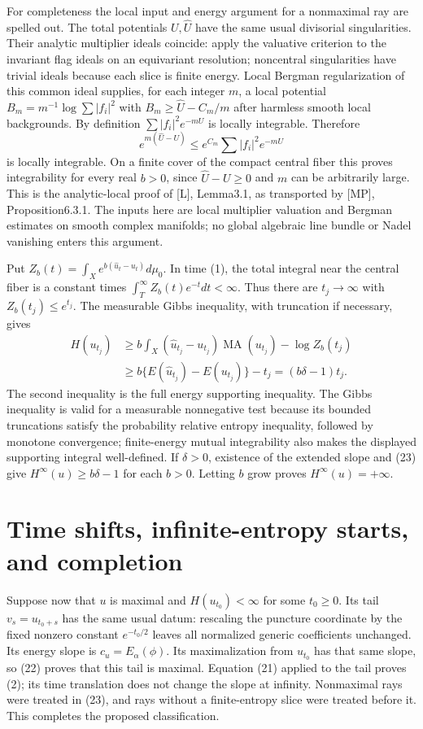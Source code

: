 \documentclass[11pt]{article}
\newcommand{\MA}{\operatorname{MA}}
\begin{document}
For completeness the local input and energy argument for a nonmaximal
ray are spelled out. The total potentials $U,\widehat U$ have the
same usual divisorial singularities. Their analytic multiplier ideals
coincide: apply the valuative criterion to the invariant flag ideals
on an equivariant resolution; noncentral singularities have trivial
ideals because each slice is finite energy. Local Bergman
regularization of this common ideal supplies, for each integer $m$,
a local potential $B_m=m^{-1}\log\sum|f_i|^2$ with
$B_m\geq\widehat U-C_m/m$ after harmless smooth local backgrounds.
By definition $\sum|f_i|^2e^{-mU}$ is locally integrable. Therefore
\[
 e^{m(\widehat U-U)}
          \leq e^{C_m}\sum|f_i|^2e^{-mU}
\]
is locally integrable. On a finite cover of the compact central fiber
this proves integrability for every real $b>0$, since
$\widehat U-U\geq0$ and $m$ can be arbitrarily large.
This is the analytic-local proof of [L], Lemma3.1, as transported by
[MP], Proposition6.3.1. The inputs here are local multiplier
valuation and Bergman estimates on smooth complex manifolds; no
global algebraic line bundle or Nadel vanishing enters this argument.

Put $Z_b(t)=\int_Xe^{b(\widehat u_t-u_t)}d\mu_0$. In time (1),
the total integral near the central fiber is a constant times
$\int_T^\infty Z_b(t)e^{-t}dt<\infty$.
Thus there are $t_j\to\infty$ with $Z_b(t_j)\leq e^{t_j}$.
The measurable Gibbs inequality, with truncation if necessary, gives
\[
 \begin{split}
 H(u_{t_j})&\geq b\int_X(\widehat u_{t_j}-u_{t_j})\MA(u_{t_j})
                                      -\log Z_b(t_j)\\
 &\geq b\{E(\widehat u_{t_j})-E(u_{t_j})\}-t_j
       =(b\delta-1)t_j.
 \end{split}                                                \tag{23}
\]
The second inequality is the full energy supporting inequality.
The Gibbs inequality is valid for a measurable nonnegative test
because its bounded truncations satisfy the probability relative
entropy inequality, followed by monotone convergence; finite-energy
mutual integrability also makes the displayed supporting integral
well-defined. If $\delta>0$, existence of the extended slope and
(23) give $H^\infty(u)\geq b\delta-1$ for each $b>0$.
Letting $b$ grow proves $H^\infty(u)=+\infty$.

\section{Time shifts, infinite-entropy starts, and completion}
Suppose now that $u$ is maximal and $H(u_{t_0})<\infty$ for some
$t_0\geq0$. Its tail $v_s=u_{t_0+s}$ has the same usual datum:
rescaling the puncture coordinate by the fixed nonzero constant
$e^{-t_0/2}$ leaves all normalized generic coefficients unchanged.
Its energy slope is $c_u=E_\alpha(\phi)$. Its maximalization from
$u_{t_0}$ has that same slope, so (22) proves that this tail is
maximal. Equation (21) applied to the tail proves (2); its time
translation does not change the slope at infinity. Nonmaximal rays
were treated in (23), and rays without a finite-entropy slice were
treated before it. This completes the proposed classification.
\end{document}
